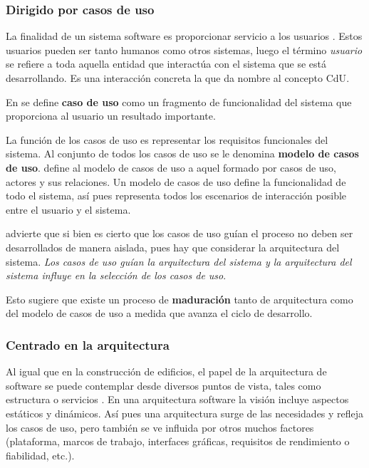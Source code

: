 \subsubsection{Dirigido por casos de uso}

La finalidad de un sistema software es proporcionar servicio a los usuarios
\cite{rumbaugh_jacobson_pud}. Estos usuarios pueden ser tanto humanos como otros
sistemas, luego el término \textit{usuario} se refiere a toda aquella entidad
que interactúa con el sistema que se está desarrollando. Es una interacción
concreta la que da nombre al concepto \acf{CdU}.

En \cite{rumbaugh_jacobson_pud} se define \textbf{caso de uso} como un fragmento
de funcionalidad del sistema que proporciona al usuario un resultado
importante. 

La función de los casos de uso es representar los requisitos funcionales del
sistema. Al conjunto de todos los casos de uso se le denomina \textbf{modelo de
  casos de uso}. \cite{rumbaugh_jacobson_pud} define al modelo de casos de uso
a aquel formado por casos de uso, actores y sus relaciones. Un modelo de casos de
uso define la funcionalidad de todo el sistema, así pues representa todos los
escenarios de interacción posible entre el usuario y el sistema. 

\cite{rumbaugh_jacobson_pud} advierte que si bien es cierto que los casos de uso
guían el proceso no deben ser desarrollados de manera aislada, pues hay que
considerar la arquitectura del sistema. \textit{Los casos de uso guían la
  arquitectura del sistema y la arquitectura del sistema influye en la selección
  de los casos de uso}. 

Esto sugiere que existe un proceso de \textbf{maduración} tanto de arquitectura
como del modelo de casos de uso a medida que avanza el ciclo de desarrollo. 
 

\subsubsection{Centrado en la arquitectura}

Al igual que en la construcción de edificios, el papel de la arquitectura de
software se puede contemplar desde diversos puntos de vista, tales como
estructura o servicios \cite{rumbaugh_jacobson_pud}. En una arquitectura
software la visión incluye aspectos estáticos y dinámicos. Así pues una
arquitectura surge de las necesidades y refleja los casos de uso, pero también
se ve influida por otros muchos factores (plataforma, marcos de trabajo,
interfaces gráficas, requisitos de rendimiento o fiabilidad, etc.). 

